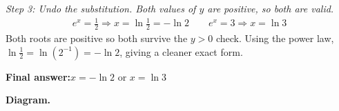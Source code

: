 \documentclass[11pt]{article}
\begin{document}
\textit{Step 3: Undo the substitution. Both values of \( y \) are positive, so both are valid.}
\[\begin{gathered}
e^x = \frac{1}{2} \Rightarrow x = \ln\frac{1}{2} = -\ln 2 \qquad e^x = 3 \Rightarrow x = \ln 3
\end{gathered}\]
Both roots are positive so both survive the \( y > 0 \) check. Using the power law, \( \ln\tfrac{1}{2} = \ln(2^{-1}) = -\ln 2 \), giving a cleaner exact form.

\begin{answerbox}
\textbf{Final answer:}\quad \(\displaystyle  x = -\ln 2 \) or \(\displaystyle  x = \ln 3 \)
\end{answerbox}
\textbf{Diagram.}

\begin{center}
\end{center}
\end{document}
